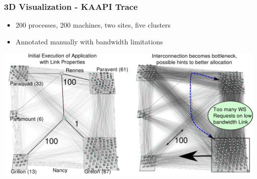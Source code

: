 \frame
{
   \frametitle{3D Visualization - KAAPI Trace}
   \begin{itemize}
   \item 200 processes, 200 machines, two sites, five clusters
   \item Annotated manually with bandwidth limitations
   \end{itemize}

   \vfill
   \hspace{-1cm}
   \begin{minipage}{\textwidth}
   \includegraphics[width=1.15\textwidth]{img/scenario-3d-C.pdf}
   \end{minipage}
}


%
%

